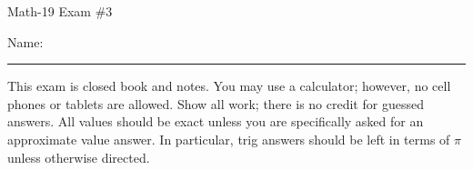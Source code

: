 \documentclass[letterpaper,12pt,fleqn]{article}
\begin{document}
\begin{center}
\Large Math-19 Exam \#3
\end{center}

\vspace{0.5in}

Name: \rule{4in}{1pt}

\vspace{0.5in}

This exam is closed book and notes. You may use a calculator; however, no cell
phones or tablets are allowed. Show all work; there is no credit for guessed
answers. All values should be exact unless you are specifically asked for an
approximate value answer. In particular, trig answers should be left in terms
of $\pi$ unless otherwise directed.

\vspace{0.5in}
\end{document}
